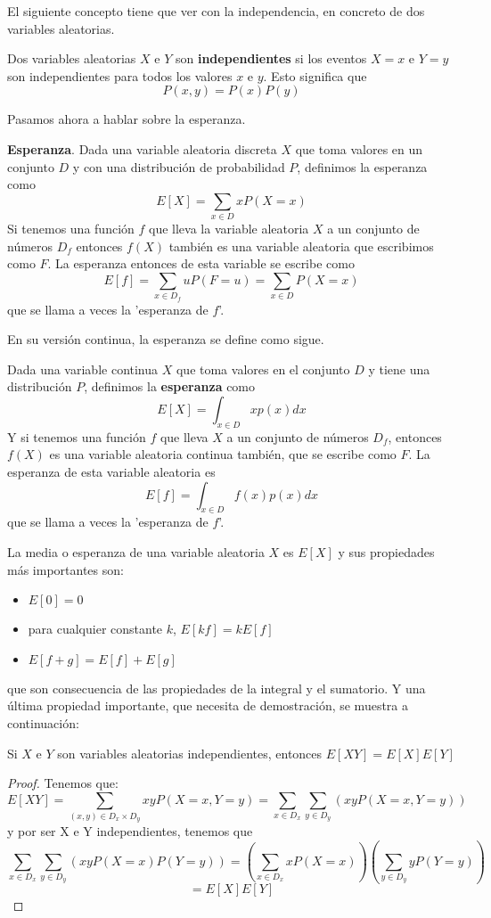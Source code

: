 El siguiente concepto tiene que ver con la independencia, en concreto de dos variables aleatorias.
\begin{definicion}
Dos variables aleatorias $X$ e $Y$ son \textbf{independientes} si los eventos $X=x$ e $Y=y$ son independientes para todos los valores $x$ e $y$. Esto significa que 
\[ P(x,y)=P(x)P(y) \]
\end{definicion}
Pasamos ahora a hablar sobre la esperanza.
\begin{definicion}
\textbf{Esperanza}. Dada una variable aleatoria discreta $X$ que toma valores en un conjunto $D$ y con una distribución de probabilidad $P$, definimos la esperanza como
\[ E[X]=\sum_{x \in D} xP(X=x) \]
Si tenemos una función $f$ que lleva la variable aleatoria $X$ a un conjunto de números $D_{f}$ entonces $f(X)$ también es una variable aleatoria que escribimos como $F$. La esperanza entonces de esta variable se escribe como
\[ E[f]=\sum_{x \in D_{f}} uP(F=u)=\sum_{x \in D}P(X=x) \]
que se llama a veces la 'esperanza de $f$'.
\end{definicion}
En su versión continua, la esperanza se define como sigue.
\begin{definicion}
Dada una variable continua $X$ que toma valores en el conjunto $D$ y tiene una distribución $P$, definimos la \textbf{esperanza} como
\[ E[X]=\int_{x \in D} xp(x)dx \]
Y si tenemos una función $f$ que lleva $X$ a un conjunto de números $D_{f}$, entonces $f(X)$ es una variable aleatoria continua también, que se escribe como $F$. La esperanza de esta variable aleatoria es 
\[ E[f]=\int_{x \in D} f(x)p(x)dx \]
que se llama a veces la 'esperanza de $f$'.
\end{definicion}
La media o esperanza de una variable aleatoria $X$ es $E[X]$ y sus propiedades más importantes son:
\begin{itemize}
 \item $E[0]=0$
 \item para cualquier constante $k$, $E[kf]=kE[f]$
 \item $E[f+g]=E[f]+E[g]$
\end{itemize}
que son consecuencia de las propiedades de la integral y el sumatorio. Y una última propiedad importante, que necesita de demostración, se muestra a continuación:
\begin{proposicion}
Si $X$ e $Y$ son variables aleatorias independientes, entonces $E[XY]=E[X]E[Y]$
\end{proposicion}
\begin{proof}
Tenemos que:
\[ E[XY]=\sum_{(x,y) \in D_{x} \times D_{y}} xyP(X=x,Y=y) = \sum_{x \in D_{x}} \sum_{y \in D_{y}} (xyP(X=x,Y=y)) \]
y por ser X e Y independientes, tenemos que
\[ \sum_{x \in D_{x}} \sum_{y \in D_{y}} (xyP(X=x)P(Y=y)) = \left( \sum_{x \in D_{x}} xP(X=x) \right) \left( \sum_{y \in D_{y}} yP(Y=y) \right) \]
\[ =E[X]E[Y] \]
\end{proof}
